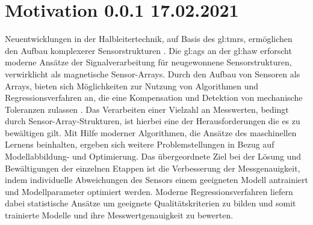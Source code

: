 %

\chapter{Motivation 0.0.1 17.02.2021}

Neuentwicklungen in der Halbleitertechnik, auf Basis des \gls{gl:tmr}s, ermöglichen den Aufbau komplexerer Sensorstrukturen \cite{Schuethe2019}. Die \gls{gl:ags} an der \gls{gl:haw} erforscht moderne Ansätze der Signalverarbeitung für neugewonnene Sensorstrukturen, verwirklicht als magnetische Sensor-Arrays. Durch den Aufbau von Sensoren als Arrays, bieten sich Möglichkeiten zur Nutzung von Algorithmen und Regressionsverfahren an, die eine Kompensation und Detektion von mechanische Toleranzen zulassen \cite{Schuethe2020}.
\newline
Das Verarbeiten einer Vielzahl an Messwerten, bedingt durch Sensor-Array-Strukturen, ist hierbei eine der Herausforderungen die es zu bewältigen gilt. Mit Hilfe moderner Algorithmen, die Ansätze des maschinellen Lernens beinhalten, ergeben sich weitere Problemstellungen in Bezug auf Modellabbildung- und Optimierung.
Das übergeordnete Ziel bei der Lösung und Bewältigungen der einzelnen Etappen ist die Verbesserung der Messgenauigkeit, indem individuelle Abweichungen des Sensors einem geeigneten Modell antrainiert und Modellparameter optimiert werden. Moderne Regressionsverfahren liefern dabei statistische Ansätze um geeignete Qualitätskriterien zu bilden und somit trainierte Modelle und ihre Messwertgenauigkeit zu bewerten.

